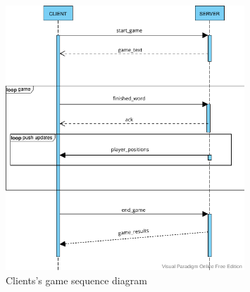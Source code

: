 \documentclass[titlepage]{article}
\begin{document}
\begin{figure}[H]
	\centering
	\includegraphics[width=0.8\textwidth]{seq_diagram_game.png}
	\caption{Clients's game sequence diagram}
	\label{fig:seq-game-leaderboard}
\end{figure}
\end{document}
